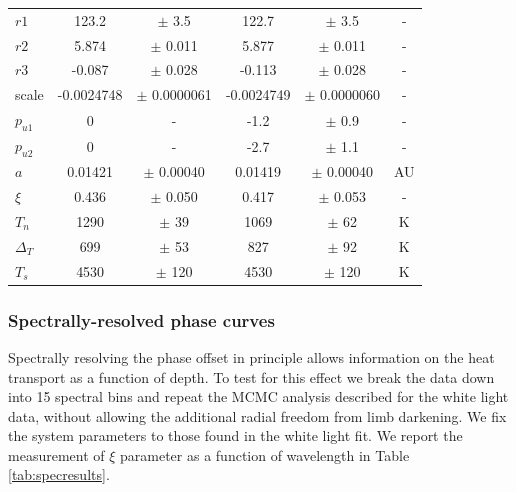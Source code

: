 \documentclass[a4paper,fleqn,usenatbib]{mnras}
\begin{document}
\begin{center}
\begin{table}
{\begin{center}
\begin{tabular}{l c c c c c}
$r1$ &        123.2 & $\pm$         3.5 &        122.7 & $\pm$         3.5 & -\\
$r2$ &        5.874 & $\pm$       0.011 &        5.877 & $\pm$       0.011 & -\\
$r3$ &       -0.087 & $\pm$       0.028 &       -0.113 & $\pm$       0.028 & -\\
scale &   -0.0024748 & $\pm$   0.0000061 &   -0.0024749 & $\pm$   0.0000060 & -\\
$p_{u1}$ & 0 & - &         -1.2 & $\pm$         0.9 & -\\
$p_{u2}$ & 0 & - &         -2.7 & $\pm$         1.1 & -\\
$a$ &      0.01421 & $\pm$     0.00040 &      0.01419 & $\pm$     0.00040 & AU\\
$\xi$ &        0.436 & $\pm$       0.050 &        0.417 & $\pm$       0.053 & -\\
$T_n$ &         1290 & $\pm$          39 &         1069 & $\pm$          62 & K\\
$\Delta_T$ &          699 & $\pm$          53 &          827 & $\pm$          92 & K\\
$T_s$ &         4530 & $\pm$         120 &         4530 & $\pm$         120 & K\\
\end{tabular}
\end{center}
\label{tab:results}
}
\end{table}
\end{center}

\subsubsection{Spectrally-resolved phase curves}

Spectrally resolving the phase offset in principle allows information on the heat transport as a function of depth. To test for this effect we break the data down into 15 spectral bins and repeat the MCMC analysis described for the white light data, without allowing the additional radial freedom from limb darkening. We fix the system parameters to those found in the white light fit. We report the measurement of $\xi$ parameter as a function of wavelength in Table \ref{tab:specresults}.
\end{document}
